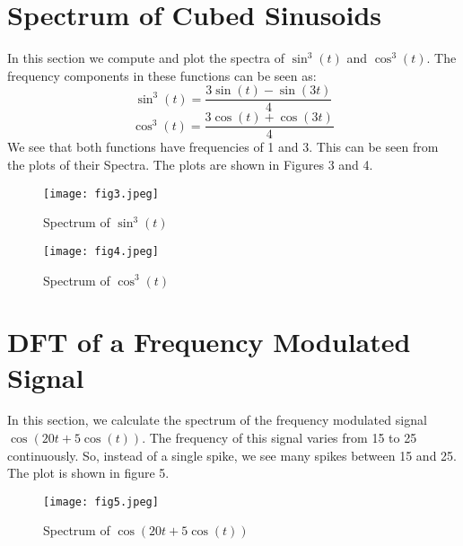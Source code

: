 \documentclass[12pt, a4paper]{article}
\begin{document}
\section{Spectrum of Cubed Sinusoids}
In this section we compute and plot the spectra of $\sin^3(t)$ and $\cos^3(t)$. The frequency components in these functions can be seen as:
\begin{equation*}
\sin^3(t) = \frac{3\sin(t) - \sin(3t)}{4}
\end{equation*}
\begin{equation*}
\cos^3(t) = \frac{3\cos(t) + \cos(3t)}{4}
\end{equation*}
We see that both functions have frequencies of 1 and 3. This can be seen from the plots of their Spectra. The plots are shown in Figures 3 and 4.

\begin{figure}
\texttt{[image: fig3.jpeg]}
\caption{Spectrum of $\sin^3(t)$}
\end{figure}

\begin{figure}
\texttt{[image: fig4.jpeg]}
\caption{Spectrum of $\cos^3(t)$}
\end{figure}

\section{DFT of a Frequency Modulated Signal}
In this section, we calculate the spectrum of the frequency modulated signal $\cos(20t + 5\cos(t))$. The frequency of this signal varies from 15 to 25 continuously. So, instead of a single spike, we see many spikes between 15 and 25. The plot is shown in figure 5.

\begin{figure}
\centering
\texttt{[image: fig5.jpeg]}
\caption{Spectrum of $\cos(20t + 5\cos(t))$}
\end{figure}
\end{document}
